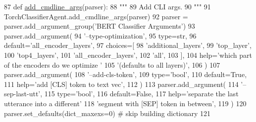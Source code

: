 \begin{DoxyCode}
87     \textcolor{keyword}{def }\hyperlink{namespaceparlai_1_1agents_1_1drqa_1_1config_a62fdd5554f1da6be0cba185271058320}{add\_cmdline\_args}(parser):
88         \textcolor{stringliteral}{"""}
89 \textcolor{stringliteral}{        Add CLI args.}
90 \textcolor{stringliteral}{        """}
91         TorchClassifierAgent.add\_cmdline\_args(parser)
92         parser = parser.add\_argument\_group(\textcolor{stringliteral}{'BERT Classifier Arguments'})
93         parser.add\_argument(
94             \textcolor{stringliteral}{'--type-optimization'},
95             type=str,
96             default=\textcolor{stringliteral}{'all\_encoder\_layers'},
97             choices=[
98                 \textcolor{stringliteral}{'additional\_layers'},
99                 \textcolor{stringliteral}{'top\_layer'},
100                 \textcolor{stringliteral}{'top4\_layers'},
101                 \textcolor{stringliteral}{'all\_encoder\_layers'},
102                 \textcolor{stringliteral}{'all'},
103             ],
104             help=\textcolor{stringliteral}{'which part of the encoders do we optimize '}
105             \textcolor{stringliteral}{'(defaults to all layers)'},
106         )
107         parser.add\_argument(
108             \textcolor{stringliteral}{'--add-cls-token'},
109             type=\textcolor{stringliteral}{'bool'},
110             default=\textcolor{keyword}{True},
111             help=\textcolor{stringliteral}{'add [CLS] token to text vec'},
112         )
113         parser.add\_argument(
114             \textcolor{stringliteral}{'--sep-last-utt'},
115             type=\textcolor{stringliteral}{'bool'},
116             default=\textcolor{keyword}{False},
117             help=\textcolor{stringliteral}{'separate the last utterance into a different'}
118             \textcolor{stringliteral}{'segment with [SEP] token in between'},
119         )
120         parser.set\_defaults(dict\_maxexs=0)  \textcolor{comment}{# skip building dictionary}
121 
\end{DoxyCode}
\mbox{\label{classparlai_1_1agents_1_1bert__classifier_1_1bert__classifier_1_1BertClassifierAgent_a9bd6daeddde03212d67e452ef93118c4}} 
